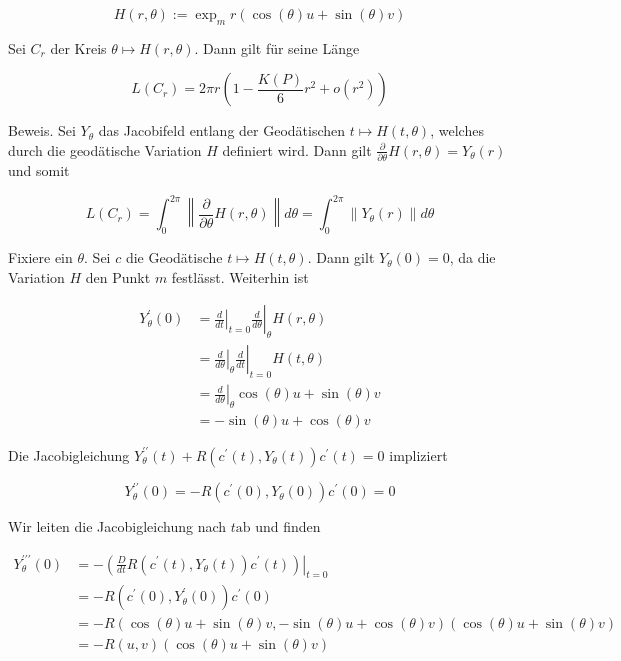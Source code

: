 \documentclass[10pt]{article}
\begin{document}
$$
H(r, \theta):=\exp _{m} r(\cos (\theta) u+\sin (\theta) v)
$$

Sei $C_{r}$ der Kreis $\theta \mapsto H(r, \theta)$. Dann gilt für seine Länge

$$
L\left(C_{r}\right)=2 \pi r\left(1-\frac{K(P)}{6} r^{2}+o\left(r^{2}\right)\right)
$$

Beweis. Sei $Y_{\theta}$ das Jacobifeld entlang der Geodätischen $t \mapsto H(t, \theta)$, welches durch die geodätische Variation $H$ definiert wird. Dann gilt $\frac{\partial}{\partial \theta} H(r, \theta)=Y_{\theta}(r)$ und somit

$$
L\left(C_{r}\right)=\int_{0}^{2 \pi}\left\|\frac{\partial}{\partial \theta} H(r, \theta)\right\| d \theta=\int_{0}^{2 \pi}\left\|Y_{\theta}(r)\right\| d \theta
$$

Fixiere ein $\theta$. Sei $c$ die Geodätische $t \mapsto H(t, \theta)$. Dann gilt $Y_{\theta}(0)=0$, da die Variation $H$ den Punkt $m$ festlässt. Weiterhin ist

$$
\begin{aligned}
Y_{\theta}^{\prime}(0) & =\left.\left.\frac{d}{d t}\right|_{t=0} \frac{d}{d \theta}\right|_{\theta} H(r, \theta) \\
& =\left.\left.\frac{d}{d \theta}\right|_{\theta} \frac{d}{d t}\right|_{t=0} H(t, \theta) \\
& =\left.\frac{d}{d \theta}\right|_{\theta} \cos (\theta) u+\sin (\theta) v \\
& =-\sin (\theta) u+\cos (\theta) v
\end{aligned}
$$

Die Jacobigleichung $Y_{\theta}^{\prime \prime}(t)+R\left(c^{\prime}(t), Y_{\theta}(t)\right) c^{\prime}(t)=0$ impliziert

$$
Y_{\theta}^{\prime \prime}(0)=-R\left(c^{\prime}(0), Y_{\theta}(0)\right) c^{\prime}(0)=0
$$

Wir leiten die Jacobigleichung nach $t \mathrm{ab}$ und finden

$$
\begin{aligned}
Y_{\theta}^{\prime \prime \prime}(0) & =-\left.\left(\frac{D}{d t} R\left(c^{\prime}(t), Y_{\theta}(t)\right) c^{\prime}(t)\right)\right|_{t=0} \\
& =-R\left(c^{\prime}(0), Y_{\theta}^{\prime}(0)\right) c^{\prime}(0) \\
& =-R(\cos (\theta) u+\sin (\theta) v,-\sin (\theta) u+\cos (\theta) v)(\cos (\theta) u+\sin (\theta) v) \\
& =-R(u, v)(\cos (\theta) u+\sin (\theta) v)
\end{aligned}
$$
\end{document}
